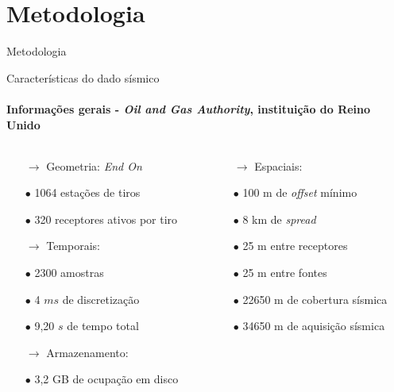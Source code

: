 \documentclass[xcolor=dvipsnames,t]{beamer}
\begin{document}
\section{Metodologia}
\begin{frame}{}
	\bigskip\bigskip\bigskip\bigskip\bigskip\bigskip
	\begin{center}
		\Huge Metodologia
	\end{center}    
\end{frame}
\begin{frame}{Características do dado sísmico}
\framesubtitle{Informações gerais - \textit{Oil and Gas Authority}, instituição do Reino Unido}	

\begin{columns}[onlytextwidth, T]
	\begin{column}{.5\textwidth}
		\begin{itemize}
			\small
			\item[$\to$] Geometria: \textit{End On}
			\item[$\bullet$] 1064 estações de tiros
			\item[$\bullet$] 320 receptores ativos por tiro
		\end{itemize}
		
		\bigskip
		\begin{itemize}
			\small
			\item[$\to$] Temporais:
			\item[$\bullet$] 2300 amostras
			\item[$\bullet$] 4 $ms$ de discretização
			\item[$\bullet$] 9,20 $s$ de tempo total
		\end{itemize}
		
		\bigskip
		\begin{itemize}
			\small
			\item[$\to$] Armazenamento:
			\item[$\bullet$] 3,2 GB de ocupação em disco
		\end{itemize}		
	\end{column}

	\begin{column}{.5\textwidth}
		\begin{itemize}
			\small
			\item[$\to$] Espaciais:
			\item[$\bullet$] 100 m de \textit{offset} mínimo
			\item[$\bullet$] 8 km de \textit{spread} 	
			\item[$\bullet$] 25 m entre receptores
			\item[$\bullet$] 25 m entre fontes
			\item[$\bullet$] 22650 m de cobertura sísmica
			\item[$\bullet$] 34650 m de aquisição sísmica
		\end{itemize}		
	\end{column}
\end{columns}

\end{frame}
\end{document}
